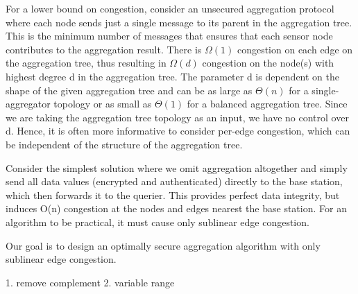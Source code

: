 For a lower bound on congestion, consider an unsecured aggregation
protocol where each node sends just a single message to
its parent in the aggregation tree. This is the minimum number
of messages that ensures that each sensor node contributes to the
aggregation result. There is $\Omega(1)$ congestion on each edge on the
aggregation tree, thus resulting in $\Omega(d)$ congestion on the node(s)
with highest degree d in the aggregation tree. The parameter d is
dependent on the shape of the given aggregation tree and can be as
large as $\Theta(n)$ for a single-aggregator topology or as small as $\Theta(1)$ for a balanced aggregation tree. Since we are taking the aggregation
tree topology as an input, we have no control over d. Hence,
it is often more informative to consider per-edge congestion, which
can be independent of the structure of the aggregation tree.

Consider the simplest solution where we omit aggregation altogether
and simply send all data values (encrypted and authenticated)
directly to the base station, which then forwards it to the
querier. This provides perfect data integrity, but induces O(n) congestion
at the nodes and edges nearest the base station. For an algorithm
to be practical, it must cause only sublinear edge congestion.

Our goal is to design an optimally secure aggregation algorithm
with only sublinear edge congestion.


	1. remove complement
	2. variable range
